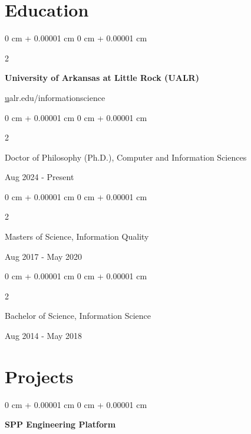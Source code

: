 \documentclass[10pt, letterpaper]{article}
\newenvironment{highlights}{
    \begin{itemize}[
        topsep=0.10 cm,
        parsep=0.10 cm,
        partopsep=0pt,
        itemsep=0pt,
        leftmargin=0 cm + 10pt
    ]
}{
    \end{itemize}
} %
\newenvironment{onecolentry}{
    \begin{adjustwidth}{
        0 cm + 0.00001 cm
    }{
        0 cm + 0.00001 cm
    }
}{
    \end{adjustwidth}
} %
\newenvironment{twocolentry}[2][]{
    \onecolentry
    \def\secondColumn{#2}
    \setcolumnwidth{\fill, 4.5 cm}
    \begin{paracol}{2}
}{
    \switchcolumn \raggedleft \secondColumn
    \end{paracol}
    \endonecolentry
} %
\begin{document}
        \section{Education}
        \begin{samepage}
        \begin{twocolentry}{
            \href{https://ualr.edu/informationscience} ualr.edu/informationscience 
        }
            \textbf{University of Arkansas at Little Rock (UALR)}
        \end{twocolentry}
             
        
        \vspace{0.25cm}

        \begin{twocolentry}{
            Aug 2024 - Present
        }
            Doctor of Philosophy (Ph.D.), Computer and Information Sciences
        \end{twocolentry}
        
        \begin{twocolentry}{
            Aug 2017 - May 2020
        }
            Masters of Science, Information Quality
        \end{twocolentry}

        \begin{twocolentry}{
            Aug 2014 - May 2018
        }
            Bachelor of Science, Information Science
        \end{twocolentry}
        
    \end{samepage}

    \vspace{0.2 cm}
    
    \section{Projects}



        
        \begin{onecolentry}
            \textbf{SPP Engineering Platform}
        \end{onecolentry}
        
\end{document}
